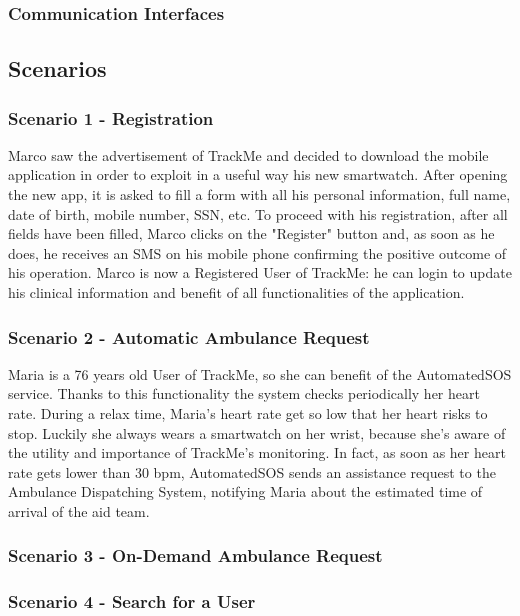 \documentclass[12pt,a4paper]{article}
\begin{document}
	\subsubsection{Communication Interfaces}
	
	\newpage
	\subsection{Scenarios}
	\subsubsection*{Scenario 1 - Registration}
	Marco saw the advertisement of TrackMe and decided to download the mobile application in order to exploit in a useful way his new smartwatch. After opening the new app, it is asked to fill a form with all his personal information, full name, date of birth, mobile number, SSN, etc. To proceed with his registration, after all fields have been filled, Marco clicks on the "Register" button and, as soon as he does, he receives an SMS on his mobile phone confirming the positive outcome of his operation. Marco is now a Registered User of TrackMe: he can login to update his clinical information and benefit of all functionalities of the application.
	\subsubsection*{Scenario 2 - Automatic Ambulance Request}
	Maria is a 76 years old User of TrackMe, so she can benefit of the AutomatedSOS service. Thanks to this functionality the system checks periodically her heart rate. During a relax time, Maria's heart rate get so low that her heart risks to stop. Luckily she always wears a smartwatch on her wrist, because she's aware of the utility and importance of TrackMe's monitoring. In fact, as soon as her heart rate gets lower than 30 bpm, AutomatedSOS sends an assistance request to the Ambulance Dispatching System, notifying Maria about the estimated time of arrival of the aid team.
	
	\subsubsection*{Scenario 3 - On-Demand Ambulance Request}
	
	\subsubsection*{Scenario 4 - Search for a User}
	
\end{document}
